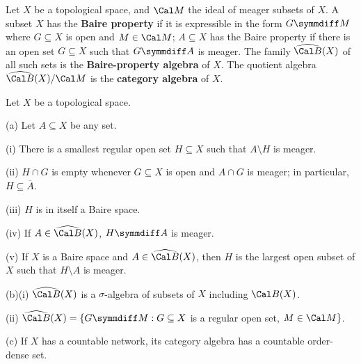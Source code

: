  Let $X$ be a topological space, and $\Cal M$
the ideal of meager subsets of $X$.   A subset
$X$ has the {\bf Baire property} if it is expressible in the form
$G\symmdiff M$
where $G\subseteq X$ is open and $M\in\Cal M$;
$A\subseteq X$ has the Baire property if there is an open set
$G\subseteq X$ such that $G\symmdiff A$ is meager.      The family
$\widehat{\Cal B}(X)$ of all such sets is the {\bf Baire-property
algebra} of $X$.
   
The quotient algebra $\widehat{\Cal B}(X)/\Cal M$ is the {\bf category
algebra} of $X$.

 Let $X$ be a topological space.

(a) Let $A\subseteq X$ be any set.

\quad(i) There is a smallest regular open set $H\subseteq X$ such that
$A\setminus H$ is meager.

\quad(ii) $H\cap G$ is empty whenever $G\subseteq X$ is open and
$A\cap G$ is meager;  in particular, $H\subseteq\overline{A}$.

\quad(iii) $H$ is in itself a Baire space.

\quad(iv) If $A\in\widehat{\Cal B}(X)$, $H\symmdiff A$ is meager.

\quad(v) If $X$ is a Baire space and $A\in\widehat{\Cal B}(X)$, then
$H$ is the largest open subset of $X$ such that $H\setminus A$ is meager.

(b)(i) $\widehat{\Cal B}(X)$ is a $\sigma$-algebra of subsets of $X$
including $\Cal B(X)$.

\quad(ii) $\widehat{\Cal B}(X)=\{G\symmdiff M:G\subseteq X$ is
a regular open set, $M\in\Cal M\}$.

(c) If $X$ has a
countable network, its category algebra has a countable
order-dense set.

